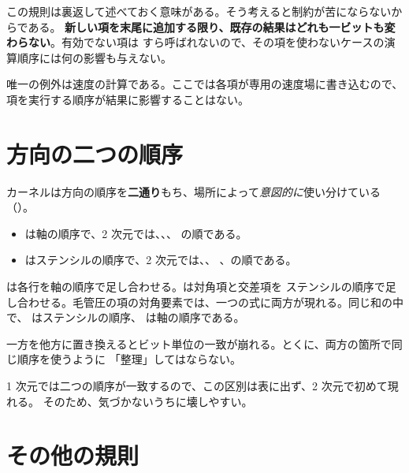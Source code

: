この規則は裏返して述べておく意味がある。そう考えると制約が苦にならないからである。
\textbf{新しい項を末尾に追加する限り、既存の結果はどれも一ビットも変わらない}。有効でない項は
すら呼ばれないので、その項を使わないケースの演算順序には何の影響も与えない。

唯一の例外は速度の計算である。ここでは各項が専用の速度場に書き込むので、
項を実行する順序が結果に影響することはない。

\section{方向の二つの順序}
\label{sec:repro:directions}

カーネルは方向の順序を\textbf{二通り}もち、場所によって\emph{意図的に}使い分けている
（）。

\begin{itemize}
  \item {}は軸の順序で、2 次元では、、、
    の順である。
  \item {}はステンシルの順序で、2 次元では、、
    、の順である。
\end{itemize}

は各行を軸の順序で足し合わせる。は対角項と交差項を
ステンシルの順序で足し合わせる。毛管圧の項の対角要素では、一つの式に両方が現れる。同じ和の中で、
はステンシルの順序、
は軸の順序である。

\begin{warn}[どちらの順序を使うかはカーネル内のコメントに従う]
  一方を他方に置き換えるとビット単位の一致が崩れる。とくに、両方の箇所で同じ順序を使うように
  「整理」してはならない。
\end{warn}

1 次元では二つの順序が一致するので、この区別は表に出ず、2 次元で初めて現れる。
そのため、気づかないうちに壊しやすい。

\section{その他の規則}
\label{sec:repro:other}

